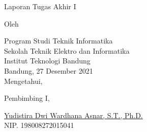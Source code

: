 \clearpage
\pagestyle{empty}

\begin{center}
    \smallskip

    \Large \bfseries \MakeUppercase{\thetitle}
    \vfill

    \Large Laporan Tugas Akhir I
    \vfill

    \large Oleh

    \Large \theauthor

    \large Program Studi Teknik Informatika \\

    \normalsize \normalfont
    Sekolah Teknik Elektro dan Informatika \\
    Institut Teknologi Bandung \\

    \vfill
    \normalsize \normalfont
    Bandung, 27 Desember 2021 \\
    Mengetahui,

    \vspace{0.5cm}
    Pembimbing I,

    \vfill
    \underline{Yudistira Dwi Wardhana Asnar, S.T., Ph.D.} \\
    NIP. 198008272015041

\end{center}
\clearpage
